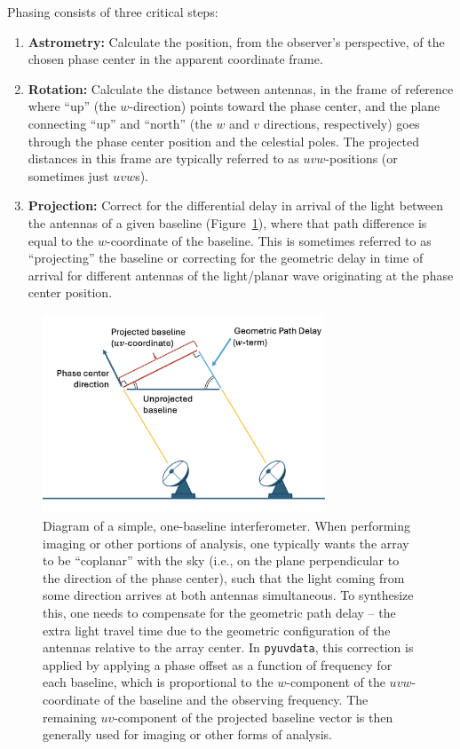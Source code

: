 \documentclass[11pt, oneside]{article}
\begin{document}
Phasing consists of three critical steps:
\begin{enumerate}
    \item \textbf{Astrometry:} Calculate the position, from the observer's perspective, of the chosen phase center in the apparent coordinate frame. 
    \item \textbf{Rotation:} Calculate the distance between antennas, in the frame of reference where ``up'' (the $w$-direction) points toward the phase center, and the plane connecting ``up'' and ``north'' (the $w$ and $v$ directions, respectively) goes through the phase center position and the celestial poles. The projected distances in this frame are typically referred to as $uvw$-positions (or sometimes just $uvw$s).
    \item \textbf{Projection:} Correct for the differential delay in arrival of the light between the antennas of a given baseline (Figure~\ref{fig:simple_interferometer}), where that path difference is equal to the $w$-coordinate of the baseline. This is sometimes referred to as ``projecting'' the baseline or correcting for the geometric delay in time of arrival for different antennas of the light/planar wave originating at the phase center position.
\end{enumerate}

\begin{figure}[!t]
    \centering
    \includegraphics[width=0.75\textwidth]{simple_interferometer.png}
    \caption{Diagram of a simple, one-baseline interferometer. When performing imaging or other portions of analysis, one typically wants the array to be ``coplanar'' with the sky (i.e., on the plane perpendicular to the direction of the phase center), such that the light coming from some direction arrives at both antennas simultaneous. To synthesize this, one needs to compensate for the geometric path delay -- the extra light travel time due to the geometric configuration of the antennas relative to the array center. In \texttt{pyuvdata}, this correction is applied by applying a phase offset as a function of frequency for each baseline, which is proportional to the $w$-component of the $uvw$-coordinate of the baseline and the observing frequency. The remaining $uv$-component of the projected baseline vector is then generally used for imaging or other forms of analysis.}
    \label{fig:simple_interferometer}
\end{figure}
\end{document}
